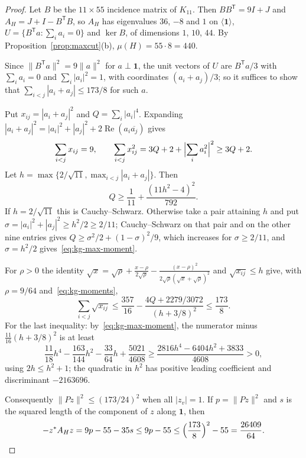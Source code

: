 \documentclass[11pt]{amsart}
\theoremstyle{tplain}
\theoremstyle{tdefinition}
\theoremstyle{tremark}
\begin{document}
\begin{proof}
Let $B$ be the $11\times55$ incidence matrix of $K_{11}$. Then
$BB^{\mathsf T}=9I+J$ and $A_H=J+I-B^{\mathsf T}B$, so $A_H$ has eigenvalues
$36$, $-8$ and $1$ on $\langle\mathbf1\rangle$,
$U=\{B^{\mathsf T}a:\sum_ia_i=0\}$ and $\ker B$, of dimensions $1$, $10$, $44$.
By Proposition~\ref{prop:maxcut}(b), $\mu(H)=55\cdot8=440$.

Since $\|B^{\mathsf T}a\|^2=9\|a\|^2$ for $a\perp\mathbf1$, the unit vectors of
$U$ are $B^{\mathsf T}a/3$ with $\sum_ia_i=0$ and $\sum_i|a_i|^2=1$, with
coordinates $(a_i+a_j)/3$; so it suffices to show that
$\sum_{i<j}|a_i+a_j|\le173/8$ for such $a$.

Put $x_{ij}=|a_i+a_j|^2$ and $Q=\sum_i|a_i|^4$. Expanding
$|a_i+a_j|^2=|a_i|^2+|a_j|^2+2\operatorname{Re}(a_i\overline{a_j})$ gives
\begin{equation}\label{eq:kg-moments}
 \sum_{i<j}x_{ij}=9,\qquad
 \sum_{i<j}x_{ij}^2=3Q+2+\Bigl|\sum_ia_i^2\Bigr|^2\ge3Q+2.
\end{equation}
Let $h=\max\{2/\sqrt{11},\max_{i<j}|a_i+a_j|\}$. Then
\begin{equation}\label{eq:kg-max-moment}
 Q\ge\frac1{11}+\frac{(11h^2-4)^2}{792}.
\end{equation}
If $h=2/\sqrt{11}$ this is Cauchy--Schwarz. Otherwise take a pair attaining
$h$ and put $\sigma=|a_i|^2+|a_j|^2\ge h^2/2\ge2/11$; Cauchy--Schwarz on that pair
and on the other nine entries gives $Q\ge\sigma^2/2+(1-\sigma)^2/9$, which increases
for $\sigma\ge2/11$, and $\sigma=h^2/2$ gives~\eqref{eq:kg-max-moment}.

For $\rho>0$ the identity
$\sqrt x=\sqrt\rho+\frac{x-\rho}{2\sqrt\rho}-\frac{(x-\rho)^2}{2\sqrt\rho(\sqrt x+\sqrt\rho)^2}$
and $\sqrt{x_{ij}}\le h$ give, with $\rho=9/64$ and~\eqref{eq:kg-moments},
\[
 \sum_{i<j}\sqrt{x_{ij}}\le\frac{357}{16}-\frac{4Q+2279/3072}{(h+3/8)^2}
 \le\frac{173}{8}.
\]
For the last inequality: by~\eqref{eq:kg-max-moment}, the numerator minus
$\frac{11}{16}(h+3/8)^2$ is at least
\[
 \frac{11}{18}h^4-\frac{163}{144}h^2-\frac{33}{64}h+\frac{5021}{4608}
 \ge\frac{2816h^4-6404h^2+3833}{4608}>0,
\]
using $2h\le h^2+1$; the quadratic in $h^2$ has positive leading coefficient
and discriminant $-2163696$.

Consequently $\|Pz\|^2\le(173/24)^2$ when all $|z_v|=1$. If $p=\|Pz\|^2$ and
$s$ is the squared length of the component of $z$ along $\mathbf1$, then
\[
 -z^*A_Hz=9p-55-35s\le9p-55\le\Bigl(\frac{173}8\Bigr)^2-55=\frac{26409}{64}.
\]
\end{proof}
\end{document}

